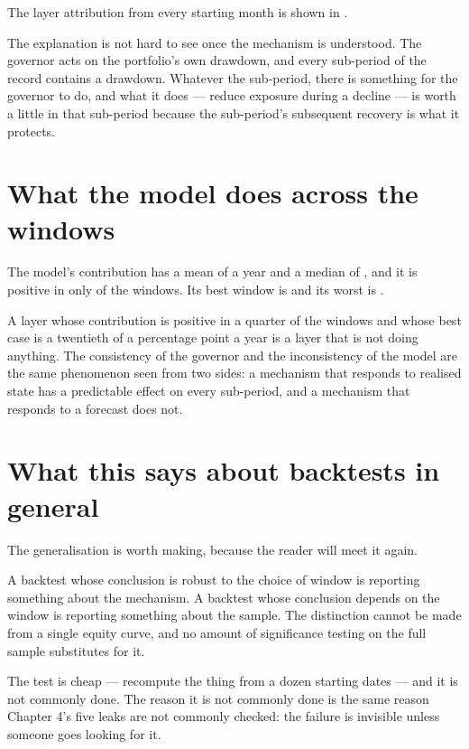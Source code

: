 The layer attribution from every starting month is shown in .

The explanation is not hard to see once the mechanism is understood. The
governor acts on the portfolio's own drawdown, and every sub-period of
the record contains a drawdown. Whatever the sub-period, there is
something for the governor to do, and what it does --- reduce exposure
during a decline --- is worth a little in that sub-period because the
sub-period's subsequent recovery is what it protects.

\section{What the model does across the windows}

The model's contribution has a mean of \numTiltMean{} a year and a median
of \numTiltMedian{}, and it is positive in only \numTiltPosFrac{} of the
windows. Its best window is \numTiltMax{} and its worst is
\numTiltMin{}.

A layer whose contribution is positive in a quarter of the windows and
whose best case is a twentieth of a percentage point a year is a layer
that is not doing anything. The consistency of the governor and the
inconsistency of the model are the same phenomenon seen from two sides: a
mechanism that responds to realised state has a predictable effect on
every sub-period, and a mechanism that responds to a forecast does not.

\section{What this says about backtests in general}

The generalisation is worth making, because the reader will meet it
again.

A backtest whose conclusion is robust to the choice of window is
reporting something about the mechanism. A backtest whose conclusion
depends on the window is reporting something about the sample. The
distinction cannot be made from a single equity curve, and no amount of
significance testing on the full sample substitutes for it.

The test is cheap --- recompute the thing from a dozen starting dates ---
and it is not commonly done. The reason it is not commonly done is the
same reason Chapter 4's five leaks are not commonly checked: the failure
is invisible unless someone goes looking for it.

